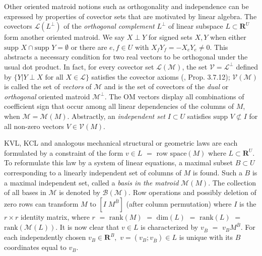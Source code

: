 \documentclass{article}
\def\Reals{\ensuremath{\mathbf R}}
\newcommand{\supp}[1]{{{\mbox{supp\ }#1}}}
\newcommand{\hmat}[2]{[#1\;#2]}
\newcommand{\extra}[1]{}
\begin{document}
Other oriented matroid 
notions such as orthogonality and 
independence can be expressed by properties of covector sets
that are motivated by linear algebra.
The covectors $\mathcal{L}(L^\perp)$ of the 
\textit{orthogonal complement}
$L^\perp$
of linear subspace $L\subset\Reals^U$ form another oriented matroid.
We say $X\perp Y$ for signed sets $X,Y$ when 
either $\supp{X}\cap\supp{Y}=\emptyset$ or
there are $e,f\in U$
with $X_fY_f = -X_eY_e \neq 0$.
This abstracts a necessary condition for 
two real vectors to be orthogonal
under the usual dot product.
In fact, for every 
covector set
$\mathcal{L}(\mathcal{M})$,
the set $\mathcal{V}=\mathcal{L}^\perp$ defined by
$\{Y | Y\perp X \mbox{\ for all\ }X\in\mathcal{L}\}$ satisfies the
covector axioms (\cite{OMBOOK}, Prop. 3.7.12); 
$\mathcal{V}(\mathcal{M})$ is called the 
set of \textit{vectors} of $\mathcal{M}$ and is the set of covectors
of the \textit{dual} or \textit{orthogonal} oriented matroid 
$\mathcal{M}^\perp$. The OM vectors display 
all combinations of coefficient 
sign that occur among all linear dependencies of the columns of $M$,
when $\mathcal{M}=\mathcal{M}(M)$.
\extra{More directly, an independent set $I\subset U$ is characterized by: 
for all $3^{|I|}$ ``input'' assignments $i$ of $e\in I$ to $\{+,-,0\}$, 
there exists a covector $X\in \mathcal{L}(\mathcal{M})$ for which
$X_e = i_e$ for all $e\in I$.}  Abstractly, an \textit{independent set}
$I\subset U$ satisfies $\supp{V}\not\subset I$ for all non-zero 
vectors $V\in\mathcal{V}(\mathit{M})$.

KVL, KCL and analogous mechanical structural or geometric laws 
are each formulated by a constraint of the form 
$v\in L$ $=$ $\mbox{row space}(M)$
where $L\subset\Reals^U$.  To
reformulate this law by a system of linear equations,
a maximal subset $B\subset U$ corresponding to
a linearly independent set of columns of $M$ is found.  Such a $B$ is
a maximal independent set,
called a \textit{basis in the matroid} $\mathcal{M}(M)$.
The collection of all bases in $\mathcal{M}$ is denoted by 
$\mathcal{B}(\mathcal{M})$.
Row operations and possibly deletion of zero rows can transform
$M$ to $\hmat{I}{M^{\overline{B}}}$ (after column permutation)
where $I$ is the $r\times r$ identity matrix, where $r$ $=$ 
$\mbox{rank}(M)$ $=$ $\mbox{dim}(L)$ $=$ $\mbox{rank}(L)$
$=$ $\mbox{rank}(\mathcal{M}(L))$.    
It is now clear that $v\in L$ is characterized by 
$v_{\overline{B}}$ $=$ $v_{B}M^{\overline{B}}$.
For each independently chosen
$v_{B}\in\Reals^B,$ $v=(v_B;v_{\overline{B}})\in L$ is unique
with its $B$ coordinates equal to $v_B$.
\end{document}
